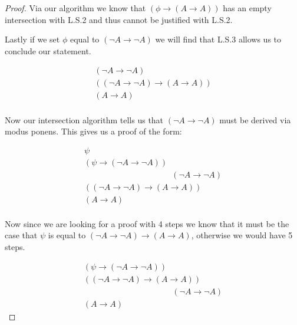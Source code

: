 \documentclass{article}
\begin{document}
\begin{proof}
Via our algorithm we know that $(\phi \rightarrow (A \rightarrow A))$ has an empty intersection with L.S.2 and thus cannot be justified with L.S.2.

Lastly if we set $\phi$ equal to $(\neg A \rightarrow \neg A)$ we will find that L.S.3 allows us to conclude our statement.

\begin{gather*}
(\neg A \rightarrow \neg A) \tag{$\gamma$}\\
((\neg A \rightarrow \neg A) \rightarrow (A \rightarrow A)) \tag*{L.S.3 ($\beta$)} \\
(A \rightarrow A) \tag*{Modus Ponens ($\gamma$,$\beta$) ($\alpha$)}\\
\end{gather*}

Now our intersection algorithm tells us that $(\neg A \rightarrow \neg A)$ must be derived via modus ponens.
This gives us a proof of the form:

\begin{gather*}
\psi \tag{$\epsilon$}\\
(\psi \rightarrow (\neg A \rightarrow \neg A)) \tag{$\delta$} \\
\phantom{\text{Modus Ponens ($\epsilon$, $\delta$) ($\gamma$)}} (\neg A \rightarrow \neg A) \tag*{Modus Ponens ($\epsilon$, $\delta$) ($\gamma$)}\\
((\neg A \rightarrow \neg A) \rightarrow (A \rightarrow A)) \tag*{L.S.3 ($\beta$)} \\
(A \rightarrow A) \tag*{Modus Ponens ($\gamma$,$\beta$) ($\alpha$)}\\
\end{gather*}

Now since we are looking for a proof with 4 steps we know that it must be the case that $\psi$ is equal to $(\neg A \rightarrow \neg A) \rightarrow (A \rightarrow A)$, otherwise we would have 5 steps.

\begin{gather*}
(\psi \rightarrow (\neg A \rightarrow \neg A)) \tag{$\delta$} \\
((\neg A \rightarrow \neg A) \rightarrow (A \rightarrow A)) \tag*{L.S.3 ($\beta$)} \\
\phantom{\text{Modus Ponens ($\beta$, $\delta$) ($\gamma$)}} (\neg A \rightarrow \neg A) \tag*{Modus Ponens ($\beta$, $\delta$) ($\gamma$)}\\
(A \rightarrow A) \tag*{Modus Ponens ($\gamma$,$\beta$) ($\alpha$)}
\end{gather*}


\end{proof}
\end{document}
